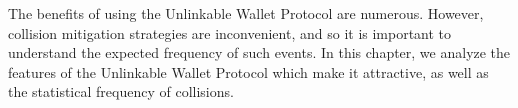 The benefits of using the Unlinkable Wallet Protocol are numerous.
However, collision mitigation strategies are inconvenient, and so it is important to understand the expected frequency of such events.
In this chapter, we analyze the features of the Unlinkable Wallet Protocol which make it attractive,
    as well as the statistical frequency of collisions.